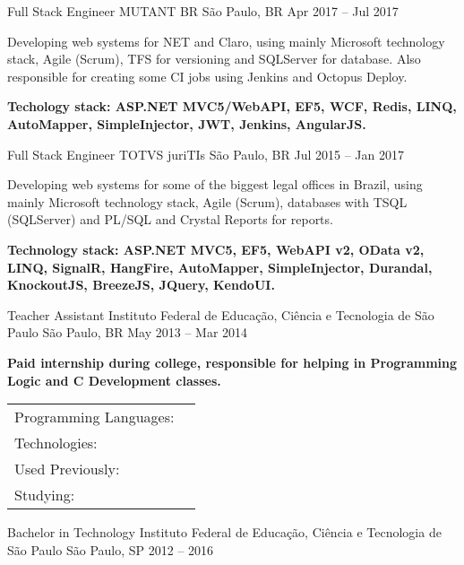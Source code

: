 \documentclass[]{awesome-cv}
\begin{document}
\begin{cventries}
{\begin{cvitems}
		\end{cvitems}}
	\cventry
	{Full Stack Engineer}
	{MUTANT BR}
	{São Paulo, BR}
	{Apr 2017 – Jul 2017}
	{\begin{cvitems}
		\item {Developing web systems for NET and Claro, using mainly Microsoft technology stack, Agile (Scrum), TFS for versioning and SQLServer for database. Also responsible for creating some CI jobs using Jenkins and Octopus Deploy.}
		\item \textbf{Techology stack: ASP.NET MVC5/WebAPI, EF5, WCF, Redis, LINQ, AutoMapper, SimpleInjector, JWT, Jenkins, AngularJS. }
		\end{cvitems}}
	\cventry
	{Full Stack Engineer}
	{TOTVS juriTIs}
	{São Paulo, BR}
	{Jul 2015 – Jan 2017}
	{\begin{cvitems}
		\item {Developing web systems for some of the biggest legal offices in Brazil, using mainly Microsoft technology stack, Agile (Scrum), databases with TSQL (SQLServer) and PL/SQL and Crystal Reports for reports.}
		\item \textbf{Technology stack: ASP.NET MVC5, EF5, WebAPI v2, OData v2, LINQ, SignalR, HangFire, AutoMapper, SimpleInjector, Durandal, KnockoutJS, BreezeJS, JQuery, KendoUI.}
		\end{cvitems}}
	\cventry
	{Teacher Assistant}
	{Instituto Federal de Educação, Ciência e Tecnologia de São Paulo}
	{São Paulo, BR}
	{May 2013 – Mar 2014}
	{\begin{cvitems}
		\item \textbf{Paid internship during college, responsible for helping in Programming Logic and C Development classes.}
		\end{cvitems}}
\end{cventries}
\begin{cventries}
	\cventry
	{}
	{\def\arraystretch{1.15}{\begin{tabular}{ l l }
		Programming Languages: {\skill{ C\#, JavaScript }} \\
		Technologies: {\skill{ Azure, Docker, Kubernetes, ELK, Pulumi, Terraform }} \\
		Used Previously: {\skill{Clojure, Go, Java}} \\
		Studying: {\skill{ Rust, F\# }} \\
		\end{tabular}}}
	{}
	{}
	{}
\end{cventries}

\vspace{-9mm}
\begin{cventries}
	\cventry
	{Bachelor in Technology}
	{Instituto Federal de Educação, Ciência e Tecnologia de São Paulo}
	{São Paulo, SP}
	{2012 – 2016}
	{}
\end{cventries}
\end{document}
